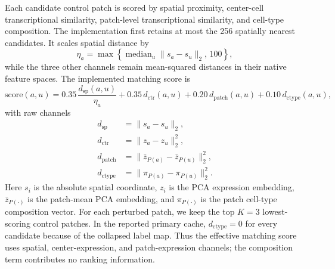 \documentclass[sigconf,review,balance=false]{acmart}
\begin{document}
Each candidate control patch is scored by spatial proximity, center-cell transcriptional similarity, patch-level transcriptional similarity, and cell-type composition. The implementation first retains at most the 256 spatially nearest candidates. It scales spatial distance by
\[
\eta_a=\max\left\{\operatorname{median}_{u}
\|s_a-s_u\|_2,\,100\right\},
\]
while the three other channels remain mean-squared distances in their native
feature spaces. The implemented matching score is
\[
\mathrm{score}(a,u)
=
0.35\,\frac{d_{\mathrm{sp}}(a,u)}{\eta_a}
+
0.35\,d_{\mathrm{ctr}}(a,u)
+
0.20\,d_{\mathrm{patch}}(a,u)
+
0.10\,d_{\mathrm{ctype}}(a,u),
\]
with raw channels
\[
\begin{aligned}
d_{\mathrm{sp}}
&=\|s_a-s_u\|_2,\\
d_{\mathrm{ctr}}
&=\|z_a-z_u\|_2^2,\\
d_{\mathrm{patch}}
&=\|\bar z_{P(a)}-\bar z_{P(u)}\|_2^2,\\
d_{\mathrm{ctype}}
&=\|\pi_{P(a)}-\pi_{P(u)}\|_2^2 .
\end{aligned}
\]
Here $s_i$ is the absolute spatial coordinate, $z_i$ is the PCA expression embedding, $\bar z_{P(\cdot)}$ is the patch-mean PCA embedding, and $\pi_{P(\cdot)}$ is the patch cell-type composition vector. For each perturbed patch, we keep the top $K=3$ lowest-scoring control patches.
In the reported primary cache, $d_{\mathrm{ctype}}=0$ for every candidate
because of the collapsed label map. Thus the effective matching score uses
spatial, center-expression, and patch-expression channels; the composition
term contributes no ranking information.
\end{document}
